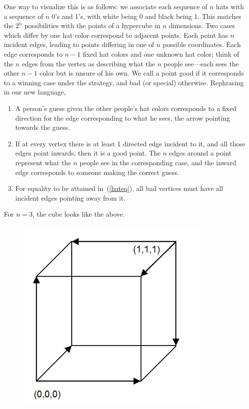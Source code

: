 \documentclass[12pt,twoside]{article}
\theoremstyle{norm}
\begin{document}
One way to visualize this is as follows: we associate each sequence of $n$ hats with a sequence of $n$ 0's and 1's, with white being 0 and black being 1. This matches the $2^n$  possibilities with the points of a hypercube in $n$ dimensions. Two cases which differ by one hat color correspond to adjacent points.
Each point has $n$ incident edges, leading to points differing in one of $n$ possible coordinates. 
Each edge corresponds to $n-1$ fixed hat colors and one unknown hat color; think of the $n$ edges from the vertex as describing what the $n$ people see---each sees the other $n-1$ color but is unsure of his own.
We call a point good if it corresponds to a winning case under the strategy, and bad (or special) otherwise. Rephrasing in our new language,
\begin{enumerate}
\item
A person's guess given the other people's hat colors corresponds to a fixed direction for the edge corresponding to what he sees, the arrow pointing towards the guess.
\item
If at every vertex there is at least 1 directed edge incident to it, and all those edges point inwards, then it is a good point. The $n$ edges around a point represent what the $n$ people see in the corresponding case, and the inward edge corresponds to someone making the correct guess.
\item
For equality to be attained in~(\ref{hateq}), all bad vertices must have all incident edges pointing away from it.
\end{enumerate}
For $n=3$, the cube looks like the above.
\begin{figure}[h!]
\centering
\includegraphics[scale=0.5]{hypercube}
\end{figure}
\end{document}
